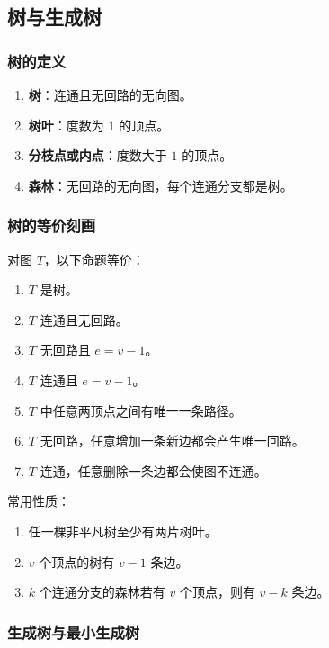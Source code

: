 \subsection{树与生成树}

\subsubsection{树的定义}

\begin{enumerate}
	\item \textbf{树}：连通且无回路的无向图。
	\item \textbf{树叶}：度数为 \(1\) 的顶点。
	\item \textbf{分枝点或内点}：度数大于 \(1\) 的顶点。
	\item \textbf{森林}：无回路的无向图，每个连通分支都是树。
\end{enumerate}

\subsubsection{树的等价刻画}

对图 \(T\)，以下命题等价：
\begin{enumerate}
	\item \(T\) 是树。
	\item \(T\) 连通且无回路。
	\item \(T\) 无回路且 \(e=v-1\)。
	\item \(T\) 连通且 \(e=v-1\)。
	\item \(T\) 中任意两顶点之间有唯一一条路径。
	\item \(T\) 无回路，任意增加一条新边都会产生唯一回路。
	\item \(T\) 连通，任意删除一条边都会使图不连通。
\end{enumerate}

常用性质：
\begin{enumerate}
	\item 任一棵非平凡树至少有两片树叶。
	\item \(v\) 个顶点的树有 \(v-1\) 条边。
	\item \(k\) 个连通分支的森林若有 \(v\) 个顶点，则有 \(v-k\) 条边。
\end{enumerate}

\subsubsection{生成树与最小生成树}


